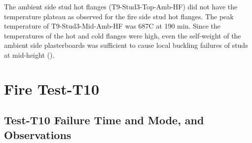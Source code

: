 The ambient side stud hot flanges (T9-Stud3-Top-Amb-HF) did not have the temperature plateau as observed for the fire side stud hot flanges. The peak temperature of T9-Stud3-Mid-Amb-HF was 687\degree C at 190 min. Since the temperatures of the hot and cold flanges were high, even the self-weight of the ambient side plasterboards was sufficient to cause local buckling failures of studs at mid-height ().

\section{Fire Test-T10}
\subsection{Test-T10 Failure Time and Mode, and Observations}

